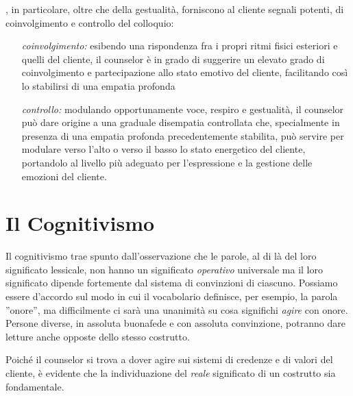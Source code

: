 , in particolare, oltre che della gestualità, forniscono al cliente segnali potenti, di coinvolgimento e controllo del colloquio:

\begin{itemize}
\item [\emph{coinvolgimento:}] esibendo una rispondenza fra i propri ritmi fisici esteriori e quelli del cliente, il counselor è in grado di suggerire un elevato grado di coinvolgimento e partecipazione allo stato emotivo del cliente, facilitando così lo stabilirsi di una empatia profonda
\item[\emph{controllo:}] modulando opportunamente voce, respiro e gestualità, il counselor può dare origine a una graduale disempatia controllata che, specialmente in presenza di una empatia  profonda precedentemente stabilita, può servire per modulare verso l'alto o verso il basso lo stato energetico del cliente, portandolo al livello più adeguato per l'espressione e la gestione delle emozioni del cliente.
\end{itemize}

\section{Il Cognitivismo}
\label{sec:cognitivismo}
Il cognitivismo trae spunto dall'osservazione che le parole, al di là del loro significato lessicale, non hanno un significato \emph{operativo} universale ma il loro significato dipende fortemente dal sistema di convinzioni di ciascuno. Possiamo essere d'accordo sul modo  in cui il vocabolario definisce, per esempio, la parola ''onore'', ma difficilmente ci sarà una unanimità su cosa significhi \emph{agire} con onore. Persone diverse, in assoluta buonafede e con assoluta convinzione, potranno dare letture anche opposte dello stesso costrutto.

Poiché il counselor si trova a dover agire sui sistemi di credenze e di valori del cliente, è evidente che la individuazione del \emph{reale} significato di un costrutto sia fondamentale.

